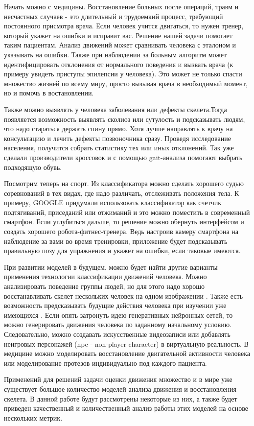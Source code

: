 Начать можно с медицины. Восстановление больных после операций, травм и несчастных случаев - это длительный и трудоемкий процесс, требующий постоянного присмотра врача. Если человек учится двигаться, то нужен тренер, который укажет  на ошибки и исправит вас. Решение нашей задачи помогает таким пациентам. Анализ движений может сравнивать человека с эталоном и указывать на ошибки. Также при наблюдении за больным алгоритм может идентифицировать отклонения от нормального поведения и вызвать врача (к примеру увидеть приступы эпилепсии у человека). Это может не только спасти множество жизней по всему миру, просто вызывая врача в необходимый момент, но и помочь в востановлении.

Также можно выявлять у  человека заболевания или дефекты скелета.Тогда появляется возможность выявлять сколиоз или сутулость и подсказывать людям, что надо стараться держать спину прямо. Хотя лучше направлять к врачу на консультацию и лечить дефекты позвоночника сразу. Проведя исследование населения, получится собрать статистику тех или иных отклонений. Так уже сделали производители кроссовок и с помощью gait-анализа \cite{WHITTLE1996369} помогают выбрать подходящую обувь.

Посмотрим теперь на спорт. Из классификатора можно сделать хорошего судью соревнований в тех видах, где надо различать, отслеживать положения тела. К примеру, GOOGLE придумали использовать классификатор как счетчик подтягиваний, приседаний или отжиманий \cite{counter} и это можно поместить в современный смартфон. Если углубиться дальше, то решение можно обернуть интерфейсом и создать хорошего робота-фитнес-тренера. Ведь настроив камеру смартфона на наблюдение за вами во время тренировки, приложение будет подсказывать правильную позу для упражнения и укажет на ошибки, если таковые имеются.

\hfill \break
При развитии моделей в будущем, можно будет найти другие варианты применения технологии классификации движений человека. Можно анализировать поведение группы людей, но для этого надо хорошо восстанавливать скелет нескольких человек на одном изображении \cite{OpenPose, https://doi.org/10.48550/arxiv.1807.04067, fang2017rmpe}. Также есть возможность предсказывать будущие действия человека при изучении уже имеющихся \cite{s20174944}. Если опять затронуть идею генеративных нейронных сетей, то можно генерировать движения человека по заданному начальному условию. Следовательно, можно создавать искусственные видеозаписи или добавлять неигровых персонажей (npc - non-player character) в виртуальную реальность. В медицине можно моделировать восстановление двигательной активности человека или моделирование протезов индивидуально под каждого пациента.

Применений для решений задачи оценки движения множество и в мире уже существует большое количество моделей анализа движения и восстановления скелета. В данной работе будут рассмотрены некоторые из них, а также будет приведен качественный и количественный анализ работы этих моделей на основе нескольких метрик.


\newpage